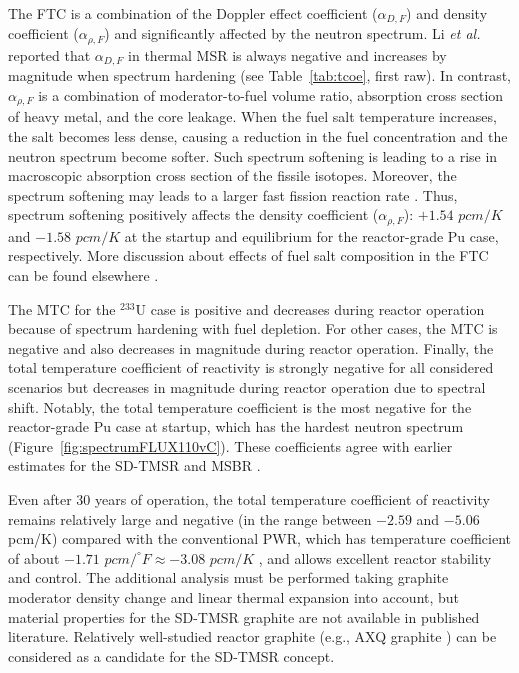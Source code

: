 The \gls{FTC} is a combination of the Doppler effect coefficient 
($\alpha_{D,F}$) and density coefficient ($\alpha_{\rho,F}$) and significantly 
affected by the neutron spectrum. Li \emph{et al.} reported that 
$\alpha_{D,F}$ in thermal \gls{MSR} is always negative and increases by 
magnitude when spectrum hardening (see Table~\ref{tab:tcoe}, first raw). 
In contrast, $\alpha_{\rho,F}$ is a combination of moderator-to-fuel volume 
ratio, absorption cross section of heavy metal, and the core leakage. When the 
fuel salt temperature increases, the salt becomes less dense, causing a 
reduction in the fuel concentration and the neutron spectrum become softer. 
Such spectrum softening is leading to a rise in macroscopic absorption cross 
section of the fissile isotopes. Moreover, the spectrum softening may leads to 
a larger fast fission reaction rate \cite{li_effects_2018-1}. Thus, spectrum 
softening positively affects the density coefficient ($\alpha_{\rho,F}$): 
$+1.54$ $pcm/K$ and $-1.58$ $pcm/K$ at the startup and equilibrium for the 
reactor-grade Pu case, respectively. More discussion about effects of fuel 
salt composition in the \gls{FTC} can be found elsewhere 
\cite{li_effects_2018-1}.

The \gls{MTC} for the $^{233}$U case is positive and decreases during reactor 
operation because of spectrum hardening with fuel depletion. For other cases, 
the \gls{MTC} is negative and also decreases in magnitude during reactor  
operation. Finally, the total temperature coefficient of reactivity is 
strongly negative for all considered scenarios but decreases in magnitude 
during reactor operation due to spectral shift. Notably, the total temperature 
coefficient is the most negative for the reactor-grade Pu case at startup, 
which has the hardest neutron spectrum (Figure~\ref{fig:spectrumFLUX110vC}). 
These coefficients agree with earlier estimates for the SD-TMSR 
\cite{li_optimization_2018, ashraf2019whole_core} and \gls{MSBR} 
\cite{rykhlevskii2019modeling, rykhlevskii_full-core_2017,  
robertson_conceptual_1971}.

Even after 30 years of operation, the total temperature coefficient of 
reactivity remains relatively large and negative (in the range between $-2.59$ 
and $-5.06$ pcm/K) compared with the conventional \gls{PWR}, which has 
temperature coefficient of about $-1.71$ $pcm/^{\circ}F\approx -3.08$ $pcm/K$ 
\cite{forget_integral_2018}, and allows excellent reactor stability and 
control. The additional analysis must be performed taking graphite moderator 
density change and linear thermal expansion into account, but material 
properties for the SD-TMSR graphite are not available in published literature. 
Relatively well-studied reactor graphite (e.g., AXQ graphite 
\cite{robertson_conceptual_1971}) can be considered as a candidate for the 
SD-TMSR concept.


